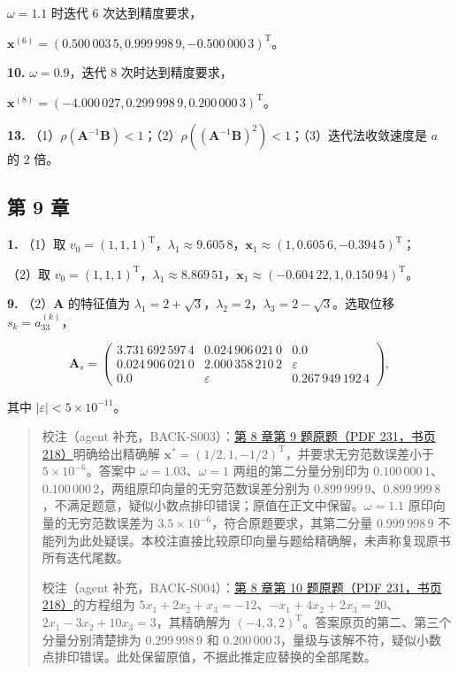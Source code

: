 \documentclass[
  10pt,
  fontset=fandol]{ctexart}
\begin{document}
\(\omega=1.1\) 时迭代 \(6\) 次达到精度要求，

\(\boldsymbol{x}^{(6)}=(0.500\,003\,5,\allowbreak 0.999\,998\,9,\allowbreak -0.500\,000\,3)^{\mathrm{T}}\)。

\textbf{10.} \(\omega=0.9\)，迭代 \(8\) 次时达到精度要求，

\(\boldsymbol{x}^{(8)}=(-4.000\,027,\allowbreak 0.299\,998\,9,\allowbreak 0.200\,000\,3)^{\mathrm{T}}\)。

\textbf{13.} （1）\(\rho(\boldsymbol{A}^{-1}\boldsymbol{B})<1\)；（2）\(\rho((\boldsymbol{A}^{-1}\boldsymbol{B})^2)<1\)；（3）迭代法收敛速度是 \(a\) 的 \(2\) 倍。

\subsection{第 9 章}\label{ux7b2c-9-ux7ae0}

\textbf{1.} （1）取 \(v_0=(1,1,1)^{\mathrm{T}}\)，\(\lambda_1\approx9.605\,8\)，\(\boldsymbol{x}_1\approx(1,0.605\,6,-0.394\,5)^{\mathrm{T}}\)；

（2）取 \(v_0=(1,1,1)^{\mathrm{T}}\)，\(\lambda_1\approx8.869\,51\)，\(\boldsymbol{x}_1\approx(-0.604\,22,1,0.150\,94)^{\mathrm{T}}\)。

\textbf{9.} （2）\(\boldsymbol{A}\) 的特征值为 \(\lambda_1=2+\sqrt{3}\)，\(\lambda_2=2\)，\(\lambda_3=2-\sqrt{3}\)。选取位移 \(s_k=a_{33}^{(k)}\)，

\[
\boldsymbol{A}_s=
\begin{pmatrix}
3.731\,692\,597\,4 & 0.024\,906\,021\,0 & 0.0\\
0.024\,906\,021\,0 & 2.000\,358\,210\,2 & \varepsilon\\
0.0 & \varepsilon & 0.267\,949\,192\,4
\end{pmatrix},
\]

其中 \(|\varepsilon|<5\times10^{-11}\)。

\begin{quote}
校注（agent 补充，BACK-S003）：\href{../../source-images/pdf-231.jpeg}{第 8 章第 9 题原题（PDF 231，书页 218）}明确给出精确解 \(\boldsymbol{x}^*=(1/2,1,-1/2)^{\mathrm{T}}\)，并要求无穷范数误差小于 \(5\times10^{-6}\)。答案中 \(\omega=1.03\)、\(\omega=1\) 两组的第二分量分别印为 \(0.100\,000\,1\)、\(0.100\,000\,2\)，两组原印向量的无穷范数误差分别为 \(0.899\,999\,9\)、\(0.899\,999\,8\)，不满足题意，疑似小数点排印错误；原值在正文中保留。\(\omega=1.1\) 原印向量的无穷范数误差为 \(3.5\times10^{-6}\)，符合原题要求，其第二分量 \(0.999\,998\,9\) 不能列为此处疑误。本校注直接比较原印向量与题给精确解，未声称复现原书所有迭代尾数。

校注（agent 补充，BACK-S004）：\href{../../source-images/pdf-231.jpeg}{第 8 章第 10 题原题（PDF 231，书页 218）}的方程组为 \(5x_1+2x_2+x_3=-12\)、\(-x_1+4x_2+2x_3=20\)、\(2x_1-3x_2+10x_3=3\)，其精确解为 \((-4,3,2)^{\mathrm{T}}\)。答案原页的第二、第三个分量分别清楚排为 \(0.299\,998\,9\) 和 \(0.200\,000\,3\)，量级与该解不符，疑似小数点排印错误。此处保留原值，不据此推定应替换的全部尾数。
\end{quote}
\end{document}
